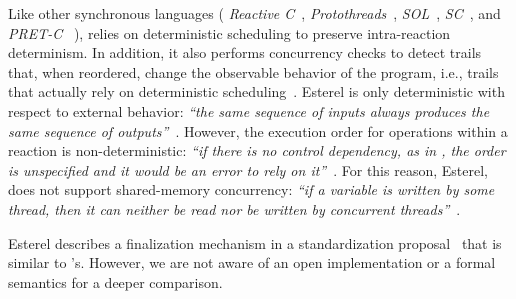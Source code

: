 Like other synchronous languages
(%
    \emph{Reactive C}~\cite{rp.rc},                 %
    \emph{Protothreads}~\cite{wsn.protothreads},    %
    \emph{SOL}~\cite{wsn.sol},                      %
    \emph{SC}~\cite{rp.synchc},                     %
    and
    \emph{PRET-C}~\cite{rp.pretc}%
),
\CEU relies on deterministic scheduling to preserve intra-reaction determinism.
%
In addition, it also performs concurrency checks to detect trails that, when
reordered, change the observable behavior of the program, i.e., trails that
actually rely on deterministic scheduling~\cite{ceu.sensys13}.
%
Esterel is only deterministic with respect to external behavior: \emph{``the
same sequence of inputs always produces the same sequence of 
outputs''}~\cite{esterel.primer}.
%
However, the execution order for operations within a reaction is 
non-deterministic: \emph{``if there is no control dependency, as in
,
the order is unspecified and it would be an error to rely on 
it''}~\cite{esterel.primer}.
%
For this reason, Esterel, does not support shared-memory concurrency:
\emph{``if a variable is written by some thread, then it can neither be read
nor be written by concurrent threads''}~\cite{esterel.primer}.

Esterel describes a finalization mechanism in a standardization
proposal~\cite{esterel.v7} that is similar to \CEU's.
However, we are not aware of an open implementation or a formal semantics for a
deeper comparison.


